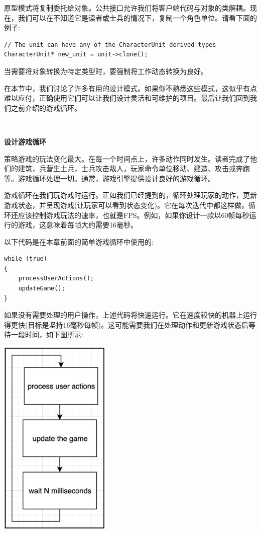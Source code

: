 原型模式将复制委托给对象。公共接口允许我们将客户端代码与对象的类解耦。现在，我们可以在不知道它是读者或士兵的情况下，复制一个角色单位。请看下面的例子: \par

\begin{lstlisting}[caption={}]
// The unit can have any of the CharacterUnit derived types
CharacterUnit* new_unit = unit->clone();
\end{lstlisting}

当需要将对象转换为特定类型时，要强制将工作动态转换为良好。 \par
在本节中，我们讨论了许多有用的设计模式。如果你不熟悉这些模式，这似乎有点难以应付，正确使用它们可以让我们设计灵活和可维护的项目。最后让我们回到我们之前介绍的游戏循环。 \par

\noindent\textbf{}\ \par
\textbf{设计游戏循环} \ \par
策略游戏的玩法变化最大。在每一个时间点上，许多动作同时发生。读者完成了他们的建筑，兵营生士兵，士兵攻击敌人，玩家命令单位移动、建造、攻击或奔跑等。游戏循环处理一切。通常，游戏引擎提供设计良好的游戏循环。 \par
游戏循环在我们玩游戏时运行。正如我们已经提到的，循环处理玩家的动作，更新游戏状态，并呈现游戏(让玩家可以看到状态变化)。它在每次迭代中都这样做。循环还应该控制游戏玩法的速率，也就是FPS。例如，如果你设计一款以60帧每秒运行的游戏，这意味着每帧大约需要16毫秒。 \par
以下代码是在本章前面的简单游戏循环中使用的: \par

\begin{lstlisting}[caption={}]
while (true)
{
	processUserActions();
	updateGame();
}
\end{lstlisting}

如果没有需要处理的用户操作，上述代码将快速运行。它在速度较快的机器上运行得更快(目标是坚持16毫秒每帧)。这可能需要我们在处理动作和更新游戏状态后等待一段时间，如下图所示: \par

\begin{center}
	\includegraphics[width=0.4\textwidth]{content/Section-2/Chapter-11/12}
\end{center}

